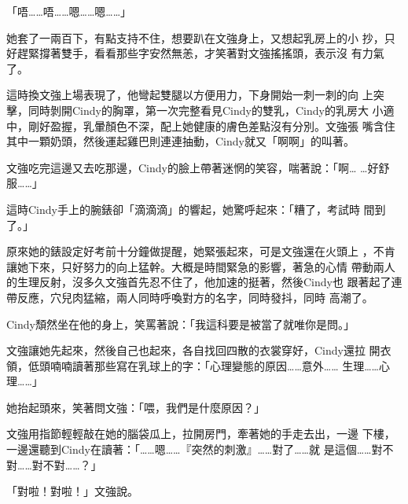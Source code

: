 「唔……唔……嗯……嗯……」

她套了一兩百下，有點支持不住，想要趴在文強身上，又想起乳房上的小
抄，只好趕緊撐著雙手，看看那些字安然無恙，才笑著對文強搖搖頭，表示沒
有力氣了。

這時換文強上場表現了，他彎起雙腿以方便用力，下身開始一刺一刺的向
上突擊，同時剝開Cindy的胸罩，第一次完整看見Cindy的雙乳，Cindy的乳房大
小適中，剛好盈握，乳暈顏色不深，配上她健康的膚色差點沒有分別。文強張
嘴含住其中一顆奶頭，然後運起雞巴則連連抽動，Cindy就又「啊啊」的叫著。

文強吃完這邊又去吃那邊，Cindy的臉上帶著迷惘的笑容，喘著說：「啊…
…好舒服……」

這時Cindy手上的腕錶卻「滴滴滴」的響起，她驚呼起來：「糟了，考試時
間到了。」

原來她的錶設定好考前十分鐘做提醒，她緊張起來，可是文強還在火頭上
，不肯讓她下來，只好努力的向上猛幹。大概是時間緊急的影響，著急的心情
帶動兩人的生理反射，沒多久文強首先忍不住了，他加速的挺著，然後Cindy也
跟著起了連帶反應，穴兒肉猛縮，兩人同時呼喚對方的名字，同時發抖，同時
高潮了。

Cindy頹然坐在他的身上，笑罵著說：「我這科要是被當了就唯你是問。」

文強讓她先起來，然後自己也起來，各自找回四散的衣裳穿好，Cindy還拉
開衣領，低頭喃喃讀著那些寫在乳球上的字：「心理變態的原因……意外……
生理……心理……」

她抬起頭來，笑著問文強：「喂，我們是什麼原因？」

文強用指節輕輕敲在她的腦袋瓜上，拉開房門，牽著她的手走去出，一邊
下樓，一邊還聽到Cindy在讀著：「……嗯……『突然的刺激』……對了……就
是這個……對不對……對不對……？」

「對啦！對啦！」文強說。










